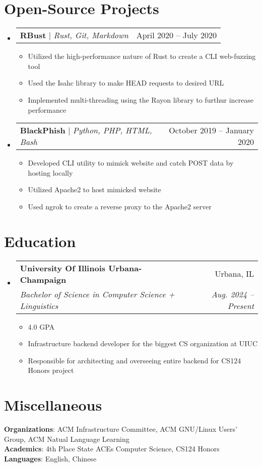 \documentclass[letterpaper,11pt]{article}
\makeatletter
\newcommand{\resumeItem}[1]{
  \item\small{
    {#1 \vspace{-2pt}}
  }
}
\newcommand{\resumeSubheading}[4]{
  \vspace{-2pt}\item
    \begin{tabular*}{0.97\textwidth}[t]{l@{\extracolsep{\fill}}r}
      \textbf{#1} & #2 \\
      \textit{\small#3} & \textit{\small #4} \\
    \end{tabular*}\vspace{-7pt}
}
\newcommand{\resumeProjectHeading}[2]{
    \item
    \begin{tabular*}{0.97\textwidth}{l@{\extracolsep{\fill}}r}
      \small#1 & #2 \\
    \end{tabular*}\vspace{-7pt}
}
\newcommand{\resumeSubHeadingListStart}{\begin{itemize}[leftmargin=0.15in, label={}]}
\newcommand{\resumeSubHeadingListEnd}{\end{itemize}}
\newcommand{\resumeItemListStart}{\begin{itemize}}
\newcommand{\resumeItemListEnd}{\end{itemize}\vspace{-5pt}}
\makeatother
\begin{document}
\section{Open-Source Projects}
    \resumeSubHeadingListStart
      \resumeProjectHeading
          {\textbf{RBust} $|$ \emph{Rust, Git, Markdown}}{April 2020 -- July 2020}
          \resumeItemListStart
            \resumeItem{Utilized the high-performance nature of Rust to create a CLI web-fuzzing tool}
            \resumeItem{Used the Isahc library to make HEAD requests to desired URL}
            \resumeItem{Implemented multi-threading using the Rayon library to furthur increase performance}
          \resumeItemListEnd
      \resumeProjectHeading
          {\textbf{BlackPhish} $|$ \emph{Python, PHP, HTML, Bash}}{October 2019 -- January 2020}
          \resumeItemListStart
            \resumeItem{Developed CLI utility to mimick website and catch POST data by hosting locally}
            \resumeItem{Utilized Apache2 to host mimicked website}
            \resumeItem{Used ngrok to create a reverse proxy to the Apache2 server}
          \resumeItemListEnd
    \resumeSubHeadingListEnd

\section{Education}
  \resumeSubHeadingListStart
    \resumeSubheading
      {University Of Illinois Urbana-Champaign}{Urbana, IL}
      {Bachelor of Science in Computer Science + Linguistics}{Aug. 2024 -- Present}
      \resumeItemListStart
        \resumeItem{4.0 GPA}
        \resumeItem{Infrastructure backend developer for the biggest CS organization at UIUC}
        \resumeItem{Responsible for architecting and overseeing entire backend for CS124 Honors project}
      \resumeItemListEnd

  \resumeSubHeadingListEnd

\section{Miscellaneous}
 \begin{itemize}[leftmargin=0.15in, label={}]
    \small{\item{
     \textbf{Organizations}{: ACM Infrastructure Committee, ACM GNU/Linux Users' Group, ACM Natual Language Learning} \\
     \textbf{Academics}{: 4th Place State ACEs Computer Science, CS124 Honors} \\
     \textbf{Languages}{: English, Chinese} \\
    }}
 \end{itemize}

\end{document}
